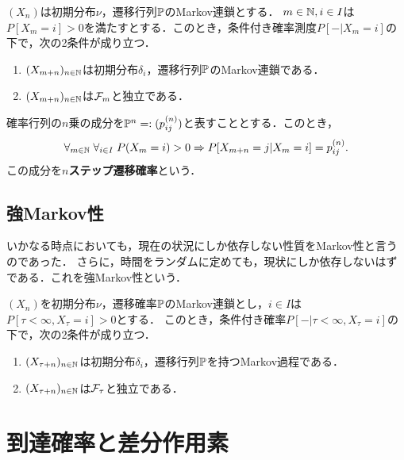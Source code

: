 \documentclass[uplatex,dvipdfmx]{jsreport}
\begin{document}
\begin{theorem}
    $(X_n)$は初期分布$\nu$，遷移行列$\mathbb{P}$のMarkov連鎖とする．
    $m\in\mathbb{N},i\in I$は$P[X_m=i]>0$を満たすとする．このとき，条件付き確率測度$P[-|X_m=i]$の下で，次の2条件が成り立つ．
    \begin{enumerate}
        \item $(X_{m+n})_{n\in\mathbb{N}}$は初期分布$\delta_i$，遷移行列$\mathbb{P}$のMarkov連鎖である．
        \item $(X_{m+n})_{n\in\mathbb{N}}$は$\mathcal{F}_m$と独立である．
    \end{enumerate}
\end{theorem}

\begin{lemma}
    確率行列の$n$乗の成分を$\mathbb{P}^n=:(p_{ij}^{(n)})$と表すこととする．このとき，
    \[\forall_{m\in\mathbb{N}}\;\forall_{i\in I}\;P(X_m=i)>0\Rightarrow P[X_{m+n}=j|X_m=i]=p^{(n)}_{ij}.\]
    この成分を\textbf{$n$ステップ遷移確率}という．
\end{lemma}

\subsection{強Markov性}

\begin{tcolorbox}[colframe=ForestGreen, colback=ForestGreen!10!white,breakable,colbacktitle=ForestGreen!40!white,coltitle=black,fonttitle=\bfseries\sffamily,
title=]
    いかなる時点においても，現在の状況にしか依存しない性質をMarkov性と言うのであった．
    さらに，時間をランダムに定めても，現状にしか依存しないはずである．これを強Markov性という．
\end{tcolorbox}

\begin{theorem}
    $(X_n)$を初期分布$\nu$，遷移確率$\mathbb{P}$のMarkov連鎖とし，$i\in I$は$P[\tau<\infty,X_\tau=i]>0$とする．
    このとき，条件付き確率$P[-|\tau<\infty,X_\tau=i]$の下で，次の2条件が成り立つ．
    \begin{enumerate}
        \item $(X_{\tau+n})_{n\in\mathbb{N}}$は初期分布$\delta_i$，遷移行列$\mathbb{P}$を持つMarkov過程である．
        \item $(X_{\tau+n})_{n\in\mathbb{N}}$は$\mathcal{F}_\tau$と独立である．
    \end{enumerate}
\end{theorem}

\section{到達確率と差分作用素}
\end{document}

